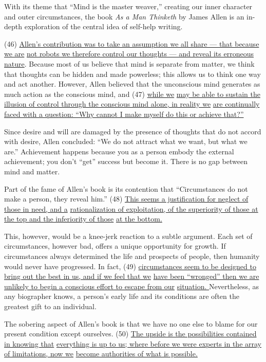 \documentclass[UTF8,11pt]{ctexart}
\begin{document}
With its theme that “Mind is the master weaver,” creating our inner character and outer circumstances, the book \textit{As a Man Thinketh} by James Allen is an in-depth exploration of the central idea of self-help writing.


(46) \uline{Allen's contribution was to take an assumption we all share — that because we are} \uline{not robots we therefore control our thoughts — and reveal its erroneous nature}. Because most of us believe that mind is separate from matter, we think that thoughts can be hidden and made powerless; this allows us to think one way and act another. However, Allen believed that the unconscious mind generates as much action as the conscious mind, and (47) \uline{while we} \uline{may be able to sustain the illusion of control through the conscious mind alone, in reality we} \uline{are continually faced with a question: “Why cannot I make myself do this or achieve that?”}


Since desire and will are damaged by the presence of thoughts that do not accord with desire, Allen concluded: “We do not attract what we want, but what we are.” Achievement happens because you as a person embody the external achievement; you don't “get” success but become it. There is no gap between mind and matter.


Part of the fame of Allen's book is its contention that “Circumstances do not make a person, they reveal him.” (48) \uline{This seems a justification for neglect of those in need, and a} \uline{rationalization of exploitation, of the superiority of those at the top and the inferiority of those} \uline{at the bottom.}


This, however, would be a knee-jerk reaction to a subtle argument. Each set of circumstances, however bad, offers a unique opportunity for growth. If circumstances always determined the life and prospects of people, then humanity would never have progressed. In fact, (49) \uline{circumstances seem to be designed to bring out the best in us, and if we feel that we} \uline{have been “wronged” then we are unlikely to begin a conscious effort to escape from our} \uline{situation. }Nevertheless, as any biographer knows, a person's early life and its conditions are often the greatest gift to an individual.


The sobering aspect of Allen's book is that we have no one else to blame for our present condition except ourselves. (50) \uline{The upside is the possibilities contained in knowing that} \uline{everything is up to us; where before we were experts in the array of limitations, now we} \uline{become authorities of what is possible.}
\end{document}
